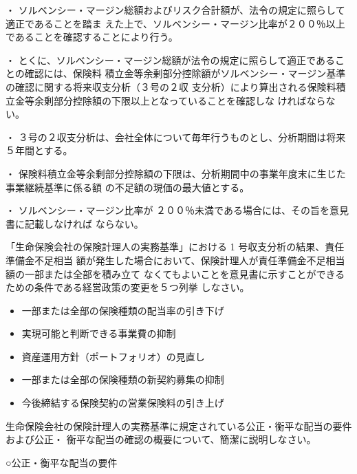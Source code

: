 \documentclass[report,gutter=10mm,fore-edge=10mm,uplatex,dvipdfmx]{jlreq}
\begin{document}
・ ソルベンシー・マージン総額およびリスク合計額が、法令の規定に照らして適正であることを踏ま
えた上で、ソルベンシー・マージン比率が２００％以上であることを確認することにより行う。

・ とくに、ソルベンシー・マージン総額が法令の規定に照らして適正であることの確認には、保険料
積立金等余剰部分控除額がソルベンシー・マージン基準の確認に関する将来収支分析（３号の２収
支分析）により算出される保険料積立金等余剰部分控除額の下限以上となっていることを確認しな
ければならない。

・ ３号の２収支分析は、会社全体について毎年行うものとし、分析期間は将来５年間とする。

・ 保険料積立金等余剰部分控除額の下限は、分析期間中の事業年度末に生じた事業継続基準に係る額
の不足額の現価の最大値とする。

・ ソルベンシー・マージン比率が ２００％未満である場合には、その旨を意見書に記載しなければ
ならない。


「生命保険会社の保険計理人の実務基準」における 1 号収支分析の結果、責任準備金不足相当
額が発生した場合において、保険計理人が責任準備金不足相当額の一部または全部を積み立て
なくてもよいことを意見書に示すことができるための条件である経営政策の変更を５つ列挙
しなさい。

\answer{}
\begin{itemize}
\item[]  一部または全部の保険種類の配当率の引き下げ
\item[]  実現可能と判断できる事業費の抑制
\item[]  資産運用方針（ポートフォリオ）の見直し
\item[]  一部または全部の保険種類の新契約募集の抑制
\item[]  今後締結する保険契約の営業保険料の引き上げ
\end{itemize}


生命保険会社の保険計理人の実務基準に規定されている公正・衡平な配当の要件および公正・
衡平な配当の確認の概要について、簡潔に説明しなさい。

\answer{}
○公正・衡平な配当の要件
\end{document}
